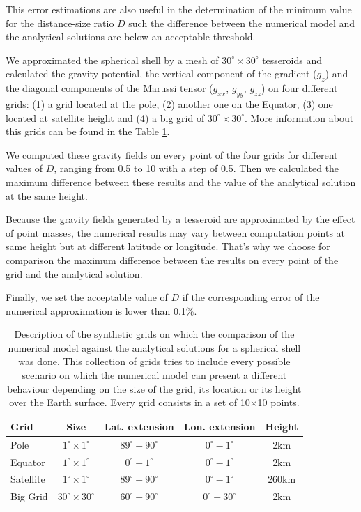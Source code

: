 \documentclass[extra]{gji}
\begin{document}
This error estimations are also useful in the determination of the minimum value for the distance-size ratio $D$ such the difference between the numerical model and the analytical solutions are below an acceptable threshold.

We approximated the spherical shell by a mesh of $30^\circ \times 30^\circ$ tesseroids and calculated the gravity potential, the vertical component of the gradient ($g_z$) and the diagonal components of the Marussi tensor ($g_{xx}$, $g_{yy}$, $g_{zz}$) on four different grids: (1) a grid located at the pole, (2) another one on the Equator, (3) one located at satellite height and (4) a big grid of $30^\circ \times 30^\circ$.
More information about this grids can be found in the Table \ref{tab:grids}.

We computed these gravity fields  on every point of the four grids for different values of $D$, ranging from 0.5 to 10 with a step of 0.5.
Then we calculated the maximum difference between these results and the value of the analytical solution at the same height.

Because the gravity fields generated by a tesseroid are approximated by the effect of point masses, the numerical results may vary between computation points at same height but at different latitude or longitude.
That's why we choose for comparison the maximum difference between the results on every point of the grid and the analytical solution.

Finally, we set the acceptable value of $D$ if the corresponding error of the numerical approximation is lower than 0.1\%.

\begin{table}
\caption{
    Description of the synthetic grids on which the comparison of the numerical model against the analytical solutions for a spherical shell was done. This collection of grids tries to include every possible scenario on which the numerical model can present a different behaviour depending on the size of the grid, its location or its height over the Earth surface. Every grid consists in a set of 10$\times$10 points.
}
\label{tab:grids}
\begin{tabular}{lcccc}
    Grid & Size & Lat. extension & Lon. extension & Height \\ \hline
    Pole & $1^\circ \times 1^\circ$ & $89^\circ - 90^\circ$ & $0^\circ - 1^\circ$ & 2km \\
    Equator & $1^\circ \times 1^\circ$ & $0^\circ - 1^\circ$ & $0^\circ - 1^\circ$ & 2km \\
    Satellite & $1^\circ \times 1^\circ$ & $89^\circ - 90^\circ$ & $0^\circ - 1^\circ$ & 260km \\
    Big Grid & $30^\circ \times 30^\circ$ & $60^\circ - 90^\circ$ & $0^\circ - 30^\circ$ & 2km \\
\end{tabular}
\end{table}
\end{document}
